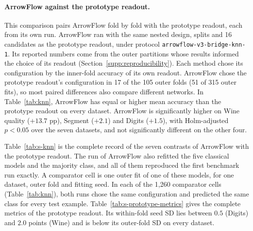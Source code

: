 


{\sloppy\paragraph{ArrowFlow against the prototype readout.} This comparison pairs ArrowFlow fold by fold with the prototype readout, each from its own run. ArrowFlow ran with the same nested design, splits and 16 candidates as the prototype readout, under protocol \texttt{arrowflow-v3-bridge-knn-1}. Its reported numbers come from the outer partitions whose results informed the choice of its readout (Section~\ref{supp:reproducibility}). Each method chose its configuration by the inner-fold accuracy of its own readout. ArrowFlow chose the prototype readout's configuration in 17 of the 105 outer folds (51 of 315 outer fits), so most paired differences also compare different networks. In Table~\ref{tab:knn}, ArrowFlow has equal or higher mean accuracy than the prototype readout on every dataset. ArrowFlow is significantly higher on Wine quality ($+13.7$ pp), Segment ($+2.1$) and Digits ($+1.5$), with Holm-adjusted $p<0.05$ over the seven datasets, and not significantly different on the other four.\par}



Table~\ref{tab:s-knn} is the complete record of the seven contrasts of ArrowFlow with the prototype readout. The run of ArrowFlow also refitted the five classical models and the majority class, and all of them reproduced the first benchmark run exactly. A comparator cell is one outer fit of one of these models, for one dataset, outer fold and fitting seed. In each of the 1,260 comparator cells (Table~\ref{tab:knn}), both runs chose the same configuration and predicted the same class for every test example. Table~\ref{tab:s-prototype-metrics} gives the complete metrics of the prototype readout. Its within-fold seed SD lies between $0.5$ (Digits) and $2.0$ points (Wine) and is below its outer-fold SD on every dataset.



